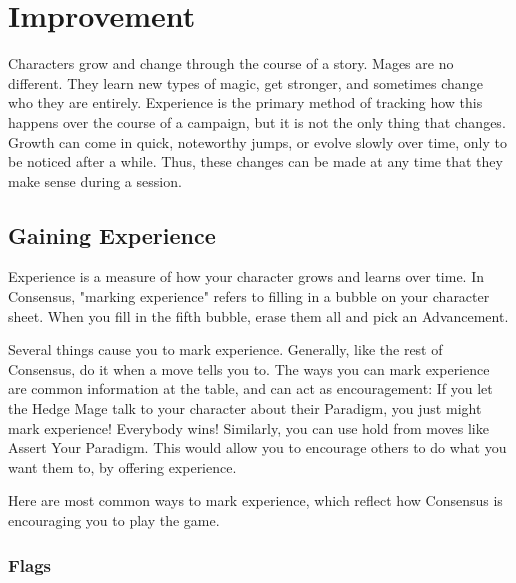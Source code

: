 \documentclass[
  oneside,
  statementpaper,
  9pt]{memoir}
\begin{document}
\newpage

\hypertarget{improvement-1}{%
\chapter{Improvement}\label{improvement-1}}

\begin{Player}

Characters grow and change through the course of a story. Mages are no different. They learn new types of magic, get stronger, and sometimes change who they are entirely. Experience is the primary method of tracking how this happens over the course of a campaign, but it is not the only thing that changes. Growth can come in quick, noteworthy jumps, or evolve slowly over time, only to be noticed after a while. Thus, these changes can be made at any time that they make sense during a session.

\end{Player}

\hypertarget{gaining-experience}{%
\section{Gaining Experience}\label{gaining-experience}}

\begin{Player}

Experience is a measure of how your character grows and learns over time. In Consensus, "marking experience" refers to filling in a bubble on your character sheet. When you fill in the fifth bubble, erase them all and pick an Advancement.

Several things cause you to mark experience. Generally, like the rest of Consensus, do it when a move tells you to. The ways you can mark experience are common information at the table, and can act as encouragement: If you let the Hedge Mage talk to your character about their Paradigm, you just might mark experience! Everybody wins! Similarly, you can use hold from moves like Assert Your Paradigm. This would allow you to encourage others to do what you want them to, by offering experience.

Here are most common ways to mark experience, which reflect how Consensus is encouraging you to play the game.

\end{Player}

\hypertarget{flags-1}{%
\subsection{Flags}\label{flags-1}}
\end{document}
